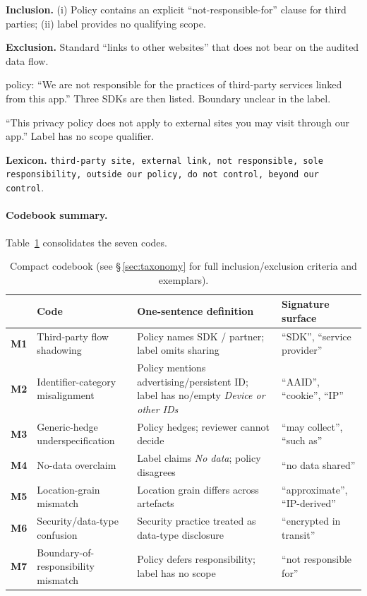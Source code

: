 \documentclass[11pt,a4paper]{article}
\newcommand{\code}[1]{\textsf{\textbf{#1}}}
\begin{document}
\textbf{Inclusion.} (i) Policy contains an explicit
``not-responsible-for'' clause for third parties; (ii) label provides
no qualifying scope.

\textbf{Exclusion.} Standard ``links to other websites'' that does
not bear on the audited data flow.

\begin{rationale}
[APP-$0915$] policy: ``We are not responsible for the practices of
third-party services linked from this app.'' Three SDKs are then
listed. Boundary unclear in the label.
\end{rationale}
\begin{rationale}
``This privacy policy does not apply to external sites you may
visit through our app.'' Label has no scope qualifier.
\end{rationale}

\textbf{Lexicon.} \texttt{third-party site, external link, not
responsible, sole responsibility, outside our policy, do not control,
beyond our control}.

\paragraph{Codebook summary.}
Table~\ref{tab:codebook} consolidates the seven codes.
\begin{table}[t]
\centering\small
\caption{Compact codebook (see \S\,\ref{sec:taxonomy} for full
inclusion/exclusion criteria and exemplars).}
\label{tab:codebook}
\renewcommand{\arraystretch}{1.2}
\begin{tabular}{p{0.6cm}p{3.6cm}p{6.1cm}p{4.6cm}}
\toprule
& \textbf{Code} & \textbf{One-sentence definition} & \textbf{Signature surface}\\
\midrule
\code{M1} & Third-party flow shadowing &
Policy names SDK / partner; label omits sharing &
``SDK'', ``service provider'' \\
\code{M2} & Identifier-category misalignment &
Policy mentions advertising/persistent ID; label has no/empty
\textsl{Device or other IDs} &
``AAID'', ``cookie'', ``IP'' \\
\code{M3} & Generic-hedge underspecification &
Policy hedges; reviewer cannot decide &
``may collect'', ``such as'' \\
\code{M4} & No-data overclaim &
Label claims \textsl{No data}; policy disagrees &
``no data shared'' \\
\code{M5} & Location-grain mismatch &
Location grain differs across artefacts &
``approximate'', ``IP-derived'' \\
\code{M6} & Security/data-type confusion &
Security practice treated as data-type disclosure &
``encrypted in transit'' \\
\code{M7} & Boundary-of-responsibility mismatch &
Policy defers responsibility; label has no scope &
``not responsible for'' \\
\bottomrule
\end{tabular}
\end{table}
\end{document}
